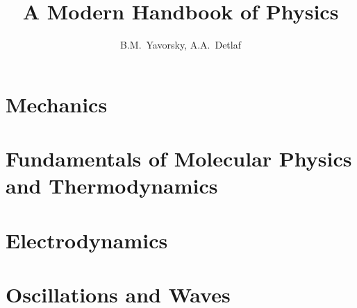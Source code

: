 \documentclass[fontsize=9pt,twoside]{scrbook}
\title{A Modern Handbook of Physics}
\author{B.M.~Yavorsky, A.A.~Detlaf}
\date{}                                           %
\begin{document}





\maketitle
\frontmatter



\tableofcontents


\mainmatter

\part{Mechanics}









\part{Fundamentals of Molecular Physics and Thermodynamics}








\part{Electrodynamics}

















\part{Oscillations and Waves}






\end{document}
